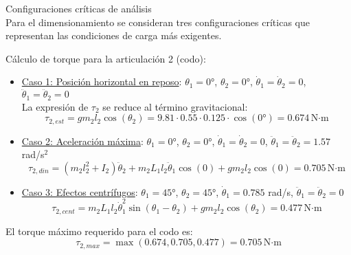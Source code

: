Configuraciones críticas de análisis\\

Para el dimensionamiento se consideran tres configuraciones críticas que representan las condiciones de carga más exigentes.

Cálculo de torque para la articulación 2 (codo):
\begin{itemize}
    \item \underline{Caso 1: Posición horizontal en reposo}: $\theta_1 = 0°$, $\theta_2 = 0°$, $\dot{\theta}_1 = \dot{\theta}_2 = 0$, $\ddot{\theta}_1 = \ddot{\theta}_2 = 0$\\
     
        La expresión de $\tau_2$ se reduce al término gravitacional:
        \begin{equation}
        \tau_{2,est} = gm_2l_2\cos(\theta_2) = 9.81 \cdot 0.55 \cdot 0.125 \cdot \cos(0°) = 0.674 \, \text{N·m}
        \end{equation}
    \item  \underline{Caso 2: Aceleración máxima}: $\theta_1 = 0°$, $\theta_2 = 0°$, $\dot{\theta}_1 = \dot{\theta}_2 = 0$, $\ddot{\theta}_1 = \ddot{\theta}_2 = 1.57$ rad/s$^2$ \\
    
        \begin{equation}
        \tau_{2,din} = (m_2l_2^2 + I_2)\ddot{\theta}_2 + m_2L_1l_2\ddot{\theta}_1\cos(0) + gm_2l_2\cos(0)
        = 0.705 \, \text{N·m}
        \end{equation}
    \item \underline{Caso 3: Efectos centrífugos}: $\theta_1 = 45°$, $\theta_2 = 45°$, $\dot{\theta}_1 = 0.785$ rad/s, $\ddot{\theta}_1 = \ddot{\theta}_2 = 0$ \\
        
        \begin{equation}
        \tau_{2,cent} = m_2L_1l_2\dot{\theta}_1^2\sin(\theta_1 - \theta_2) + gm_2l_2\cos(\theta_2) = 0.477 \, \text{N·m}
        \end{equation}
\end{itemize}

El torque máximo requerido para el codo es:
\begin{equation}
\tau_{2,max} = \max(0.674, 0.705, 0.477) = 0.705 \, \text{N·m}
\end{equation}

